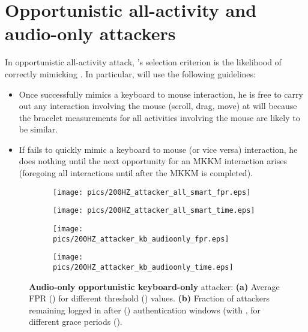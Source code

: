 \documentclass[conference]{IEEEtran}
\newcommand{\KBactivity}{keyboard-only\xspace}
\newcommand{\allactivity}{all-activity\xspace}
\newcommand{\attacker}{\xspace}
\newcommand{\victim}{\xspace}
\begin{document}
\vspace{-5mm}
\section{Opportunistic all-activity and audio-only attackers}
\label{app:extra_attackers}
In opportunistic \allactivity attack, \attacker's selection
criterion is the likelihood of correctly mimicking \victim. In
particular, \attacker will use the following guidelines:
\begin{itemize}
\itemsep0em
\item Once \attacker successfully mimics a keyboard to mouse interaction, he
  is free to carry out any interaction involving the mouse (scroll,
  drag, move) at will because the bracelet measurements for all
  activities involving the mouse are likely to be similar.
\item If \attacker fails to quickly mimic a keyboard to mouse (or vice
  versa) interaction, he
  does nothing until the next opportunity for an MKKM
  interaction arises (foregoing all interactions until after the MKKM
  is completed).
\end{itemize}


\begin{figure}[htbp]
\centering
\begin{subfigure}{.5\textwidth}
  \centering
  \texttt{[image: pics/200HZ\_attacker\_all\_smart\_fpr.eps]}
\caption{}
  \label{fig:all_smart_fpr}
\end{subfigure}\begin{subfigure}{.5\textwidth}
  \centering
  \texttt{[image: pics/200HZ\_attacker\_all\_smart\_time.eps]}
\caption{}
  \label{fig:all_smart_time}
\end{subfigure}
\caption{\textbf{Opportunistic \allactivity} attacker: \textbf{(a)}
  Average FPR for different threshold () values. \textbf{(b)}
  Fraction of attackers remaining logged in after () authentication
  windows (with , for different grace periods ().}
\centering
\begin{subfigure}{.5\textwidth}
  \centering
  \texttt{[image: pics/200HZ\_attacker\_kb\_audioonly\_fpr.eps]}
\caption{}
  \label{fig:kb_audioonly_fpr}
\end{subfigure}\begin{subfigure}{.5\textwidth}
  \centering
  \texttt{[image: pics/200HZ\_attacker\_kb\_audioonly\_time.eps]}
\caption{}
  \label{fig:kb_audioonly_time}
\end{subfigure}
\caption{\textbf{Audio-only opportunistic \KBactivity} attacker:
  \textbf{(a)} Average FPR () for different threshold ()
  values. \textbf{(b)} Fraction of attackers remaining logged in after
  () authentication windows (with , for different grace periods ().}
\end{figure}
\fi
 
\end{document}
